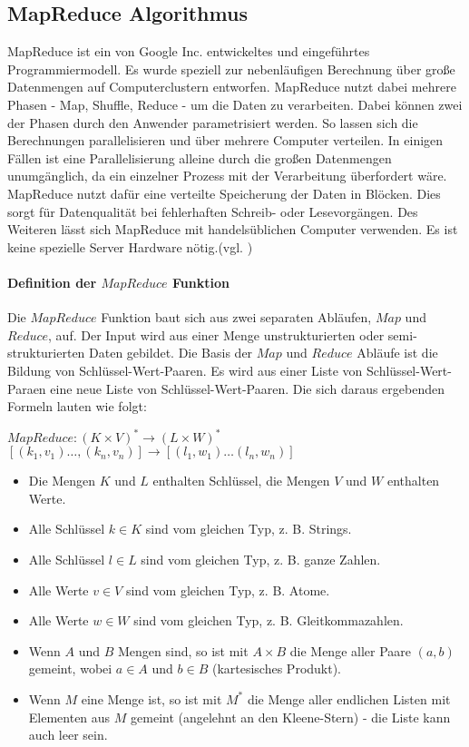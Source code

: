 \newpage
\subsection{MapReduce Algorithmus}
MapReduce ist ein von Google Inc. entwickeltes und eingeführtes Programmiermodell. Es wurde speziell zur nebenläufigen Berechnung über große Datenmengen auf Computerclustern entworfen. MapReduce nutzt dabei mehrere Phasen - Map, Shuffle, Reduce - um die Daten zu verarbeiten. Dabei können zwei der Phasen durch den Anwender parametrisiert werden. So lassen sich die Berechnungen parallelisieren und über mehrere Computer verteilen. In einigen Fällen ist eine Parallelisierung alleine durch die großen Datenmengen unumgänglich, da ein einzelner Prozess mit der Verarbeitung überfordert wäre.\\ MapReduce nutzt dafür eine verteilte Speicherung der Daten in Blöcken. Dies sorgt für Datenqualität bei fehlerhaften Schreib- oder Lesevorgängen. Des Weiteren lässt sich MapReduce mit handelsüblichen Computer verwenden. Es ist keine spezielle Server Hardware nötig.(vgl. \cite{wik15})

\paragraph{Definition der $MapReduce$ Funktion}$\;$ \\
Die $MapReduce$ Funktion baut sich aus zwei separaten Abläufen, $Map$ und $Reduce$, auf. Der Input wird aus einer Menge unstrukturierten oder semi-strukturierten Daten gebildet. Die Basis der $Map$ und $Reduce$ Abläufe ist die Bildung von Schlüssel-Wert-Paaren. Es wird aus einer Liste von Schlüssel-Wert-Paraen eine neue Liste von Schlüssel-Wert-Paaren. Die sich daraus ergebenden Formeln lauten wie folgt:

\begin{center}
    $MapReduce: (K \times V)^\ast \rightarrow (L \times W)^\ast$\\$[(k_1, v_1) \dots ,(k_n, v_n)] \rightarrow [(l_1, w_1) \dots (l_n, w_n)]$
\end{center}
\begin{itemize}
    \item Die Mengen $K$ und $L$ enthalten Schlüssel, die Mengen $V$ und $W$ enthalten Werte.
    \item Alle Schlüssel $k \in K$ sind vom gleichen Typ, z. B. Strings.
    \item Alle Schlüssel $l \in L$ sind vom gleichen Typ, z. B. ganze Zahlen.
    \item Alle Werte $v \in V$ sind vom gleichen Typ, z. B. Atome.
    \item Alle Werte $w \in W$ sind vom gleichen Typ, z. B. Gleitkommazahlen.
    \item Wenn $A$ und $B$ Mengen sind, so ist mit $A\times B$ die Menge aller Paare $(a, b)$ gemeint, wobei $a \in A$ und $b \in B$ (kartesisches Produkt).
    \item Wenn $M$ eine Menge ist, so ist mit $M^*$ die Menge aller endlichen Listen mit Elementen aus $M$ gemeint (angelehnt an den Kleene-Stern) - die Liste kann auch leer sein.
\end{itemize}

